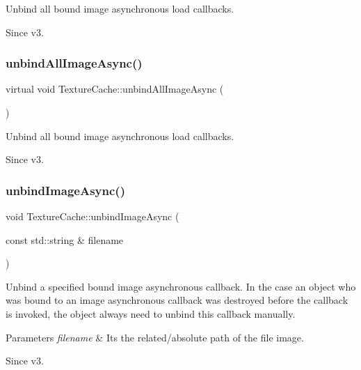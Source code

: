 Unbind all bound image asynchronous load callbacks. \begin{DoxySince}{Since}
v3. 
\end{DoxySince}
\mbox{\label{classTextureCache_a8cd53b2493af00f76d7e24a19dc2555d}} 
\subsubsection{\texorpdfstring{unbind\+All\+Image\+Async()}{unbindAllImageAsync()}\hspace{0.1cm}{\footnotesize\ttfamily [2/2]}}
{\footnotesize\ttfamily virtual void Texture\+Cache\+::unbind\+All\+Image\+Async (\begin{DoxyParamCaption}{ }\end{DoxyParamCaption})\hspace{0.3cm}{\ttfamily [virtual]}}

Unbind all bound image asynchronous load callbacks. \begin{DoxySince}{Since}
v3. 
\end{DoxySince}
\mbox{\label{classTextureCache_a3de7b70ab03d134d58fdac249c102d65}} 
\subsubsection{\texorpdfstring{unbind\+Image\+Async()}{unbindImageAsync()}\hspace{0.1cm}{\footnotesize\ttfamily [1/2]}}
{\footnotesize\ttfamily void Texture\+Cache\+::unbind\+Image\+Async (\begin{DoxyParamCaption}\item[{const std\+::string \&}]{filename }\end{DoxyParamCaption})\hspace{0.3cm}{\ttfamily [virtual]}}

Unbind a specified bound image asynchronous callback. In the case an object who was bound to an image asynchronous callback was destroyed before the callback is invoked, the object always need to unbind this callback manually. 
\begin{DoxyParams}{Parameters}
{\em filename} & It\textquotesingle{}s the related/absolute path of the file image. \\
\hline
\end{DoxyParams}
\begin{DoxySince}{Since}
v3. 
\end{DoxySince}
\mbox{\label{classTextureCache_a02c48302097f8109e604b64018267046}} 
